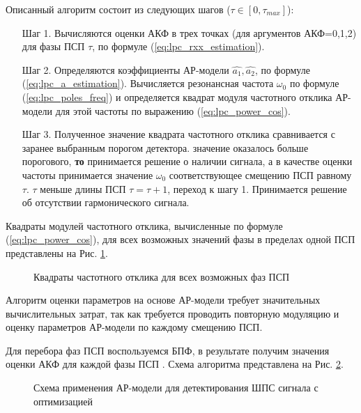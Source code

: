 Описанный алгоритм состоит из следующих шагов (${\tau \in [0, \tau_{max}]}$):
\begin{itemize}[align=left,style=nextline,leftmargin=*,labelsep=\parindent,font=\normalfont]
\item[Шаг 1.] Вычисляются оценки АКФ в трех точках (для аргументов АКФ=0,1,2)
	для фазы ПСП ${\tau}$, по формуле (\ref{eq:lpc_rxx_estimation}). 
\item[Шаг 2.] Определяются коэффициенты АР-модели ${\hat{a_1}, \hat{a_2}}$, 
	по формуле (\ref{eq:lpc_a_estimation}). 
	Вычисляется резонансная частота ${\omega_0}$ по формуле (\ref{eq:lpc_poles_freq})
	и определяется квадрат модуля частотного отклика АР-модели для этой частоты по выражению (\ref{eq:lpc_power_cos}). 
\item[Шаг 3.] Полученное значение квадрата частотного отклика сравнивается с заранее выбранным порогом детектора. 
	  значение оказалось больше порогового, {\bf{то}} 
		принимается решение о наличии сигнала, а в качестве оценки
		частоты принимается значение ${\omega_0}$ соответствующее смещению ПСП равному ${\tau}$. 
	 ${\tau}$ меньше длины ПСП ${\tau = \tau + 1}$, переход к шагу 1.
		Принимается решение об отсутствии гармонического сигнала.
\end{itemize}

Квадраты модулей частотного отклика, вычисленные по формуле (\ref{eq:lpc_power_cos}), для всех возможных значений фазы в пределах одной ПСП представлены на Рис. \ref{pic:lpc_1sat_energy}.
\begin{figure}[h]
	\center{}
	\caption{Квадраты частотного отклика для всех возможных фаз ПСП}
	\label{pic:lpc_1sat_energy}
\end{figure}


Алгоритм оценки параметров на основе АР-модели требует значительных вычислительных затрат, так как требуется проводить
повторную модуляцию и оценку параметров \mbox{АР-модели} по каждому смещению ПСП.

Для перебора фаз ПСП воспользуемся БПФ, в результате получим значения оценки АКФ для каждой фазы ПСП \cite{my_lpc_for_1, my_lpc_for_1_controllers}.
Схема алгоритма представлена на Рис. \ref{pic:lpc_basic2}. 

\begin{figure}[h]
	\center{}
	\caption{Схема применения АР-модели для детектирования ШПС сигнала с оптимизацией}
	\label{pic:lpc_basic2}
\end{figure}

